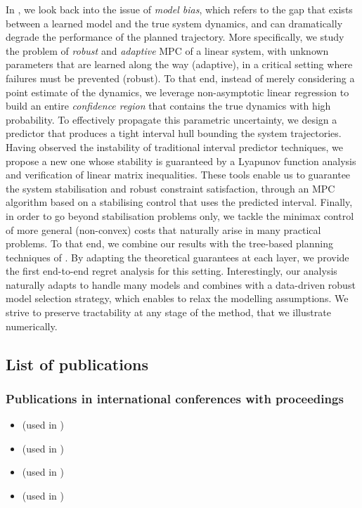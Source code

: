 In \textbf{}, we look back into the issue of \emph{model bias}, which refers to the gap that exists between a learned model and the true system dynamics, and can dramatically degrade the performance of the planned trajectory. More specifically, we study the problem of \emph{robust} and \emph{adaptive} \gls{MPC} of a linear system, with unknown parameters that are learned along the way (adaptive), in a critical setting where failures must be prevented (robust).
To that end, instead of merely considering a point estimate of the dynamics, we leverage non-asymptotic linear regression to build an entire \emph{confidence region} that contains the true dynamics with high probability.
To effectively propagate this parametric uncertainty, we design a predictor that produces a tight interval hull bounding the system trajectories. Having observed the instability of traditional interval predictor techniques, we propose a new one whose stability is guaranteed by a Lyapunov function analysis and verification of linear matrix inequalities.
These tools enable us to guarantee the system stabilisation and robust constraint satisfaction, through an \gls{MPC} algorithm based on a stabilising control that uses the predicted interval.
Finally, in order to go beyond stabilisation problems only, we tackle the minimax control of more general (non-convex) costs that naturally arise in many practical problems. To that end, we combine our results with the tree-based planning techniques of . By adapting the theoretical guarantees at each layer, we provide the first end-to-end regret analysis for this setting. Interestingly, our analysis naturally adapts to handle many models and combines with a data-driven robust model selection strategy, which enables to relax the modelling assumptions. We strive to preserve tractability at any stage of the method, that we illustrate numerically.

\subsection*{List of publications}

\subsubsection*{Publications in international conferences with proceedings}

\begin{itemize}
	\item {} (used in )
	\item {} (used in )
	\item {} (used in )
	\item {} (used in )
\end{itemize}

